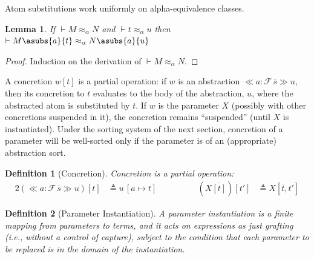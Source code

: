 \documentclass[11pt,a4paper]{amsart}
\newtheorem{definition}{Definition}
\newtheorem{lemma}{Lemma}
\newcounter{s}
\newcommand{\absterm}[2]{\ensuremath{\ll\!\!#1\!\!\gg #2}}
\newcommand{\concr}[2]{#1[#2]}
\newcommand{\vect}[1]{\ensuremath{\overline{#1}}}
\newcommand{\sconstr}[2]{\ensuremath{#1\,#2}}
\newcommand {\act}      [0] {\cdot}
\newcommand{\aSub}[3]{\ensuremath{[#1 \mapsto #2]#3}}
\newcommand {\aSubAct} [2] {#1 \, #2}
\newcommand{\varTrmD} [3] {\ensuremath{#3}} %
\newcommand {\susp}    [2] {\ifthenelse{\isempty{#1}}
                                       {\ifthenelse{\isempty{#2}}{}{#2}}
                                       {\ifthenelse{\isempty{#2}}{#1}{#1  | #2}}}
\newcommand {\hsh}      [0] {\#}
\newcommand {\frsh}    [0] {\mathrel{\hsh}}
\newcommand {\al}       [0] {{\approx_\alpha}}
\newcommand {\aleq}     [0] {\mathrel{\al}}
\begin{document}
\noindent
Atom substitutions work uniformly on alpha-equivalence classes.
\begin{lemma}
\label{dependent:aleq_sub}
If $\vdash M \aleq N$ and $\vdash t \aleq u$ then $\vdash M\asubs{a}{t} \aleq N\asubs{a}{u}$
\end{lemma}
\begin{proof}
Induction on the derivation of $\vdash M \aleq N$.
\end{proof}

A concretion $\concr{w}{t}$ is a partial operation: if $w$ is an abstraction $\absterm{a:\sconstr{\mathcal{F}}{\vect{s}}}{u}$, then its concretion to $t$ evaluates to the body of the abstraction, $u$, where the abstracted atom is substituted by $t$.
If $w$ is the parameter $X$ (possibly with other concretions suspended in it), the concretion remains ``suspended'' (until $X$ is instantiated). Under the sorting system of the next section, concretion of a parameter will be well-sorted  only if the parameter is of an (appropriate) abstraction sort.

\begin{definition}[Concretion]
Concretion is a partial operation:
\begin{alignat*}{2}
\concr{(\absterm{a:\sconstr{\mathcal{F}}{\vect{s}}}{u})}{t} & \triangleq \aSubAct{u}{\aSub{a}{t}{}}  %
 & \qquad \qquad
 \concr{(\varTrmD{\vartheta}{\pi}{X} \vect{\concr{}{t}})}{t'} & \triangleq \varTrmD{\vartheta}{\pi}{X} \concr{}{\vect{t},t'}
\end{alignat*}
\end{definition}

\begin{definition}[Parameter Instantiation]
A \emph{parameter instantiation} is a finite mapping from parameters to terms, and it acts on expressions as just grafting (i.e., without a control of capture), subject to the condition that each parameter to be replaced is in the domain of the instantiation.
\end{definition}
\end{document}

